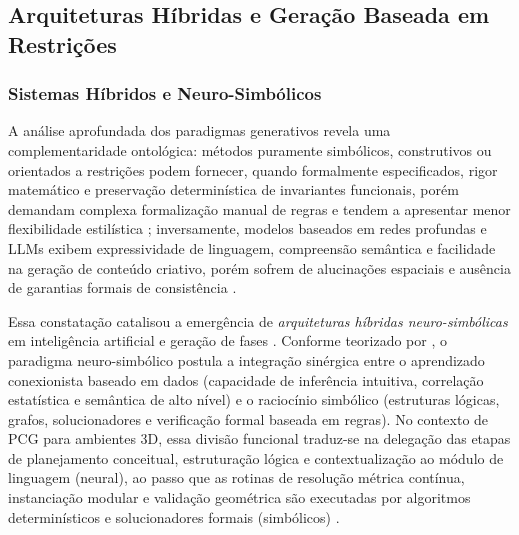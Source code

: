 \subsection{Arquiteturas Híbridas e Geração Baseada em Restrições}
\label{sec:arquiteturas_hibridas}

\subsubsection{Sistemas Híbridos e Neuro-Simbólicos}
\label{sec:sistemas_hibridos}

A análise aprofundada dos paradigmas generativos revela uma complementaridade ontológica: métodos puramente simbólicos, construtivos ou orientados a restrições podem fornecer, quando formalmente especificados, rigor matemático e preservação determinística de invariantes funcionais, porém demandam complexa formalização manual de regras e tendem a apresentar menor flexibilidade estilística \cite{shaker2016constructive, summerville2018procedural}; inversamente, modelos baseados em redes profundas e LLMs exibem expressividade de linguagem, compreensão semântica e facilidade na geração de conteúdo criativo, porém sofrem de alucinações espaciais e ausência de garantias formais de consistência \cite{Gallotta_2024, maleki2024procedural}.

Essa constatação catalisou a emergência de \textit{arquiteturas híbridas neuro-simbólicas} em inteligência artificial e geração de fases \cite{garcez2023neurosymbolic, Gallotta_2024, xu2025constraint}. Conforme teorizado por \textcite{garcez2023neurosymbolic}, o paradigma neuro-simbólico postula a integração sinérgica entre o aprendizado conexionista baseado em dados (capacidade de inferência intuitiva, correlação estatística e semântica de alto nível) e o raciocínio simbólico (estruturas lógicas, grafos, solucionadores e verificação formal baseada em regras). No contexto de PCG para ambientes 3D, essa divisão funcional traduz-se na delegação das etapas de planejamento conceitual, estruturação lógica e contextualização ao módulo de linguagem (neural), ao passo que as rotinas de resolução métrica contínua, instanciação modular e validação geométrica são executadas por algoritmos determinísticos e solucionadores formais (simbólicos) \cite{hu2024scenecraft, tang2025unrealllm, chen2025narrative, xu2025constraint, xu2025databasedrivenframework3dlevel, her2025zeroshot3dmapgeneration}.

